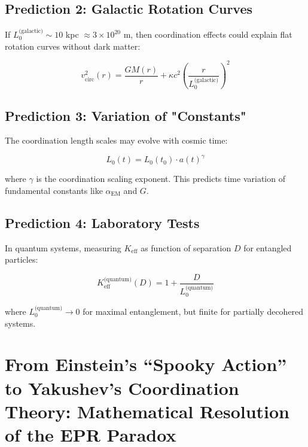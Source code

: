 \documentclass[11pt,a4paper]{article}
\begin{document}
	\subsection{Prediction 2: Galactic Rotation Curves}
	
	If $L_0^{\text{(galactic)}} \sim 10$ kpc $\approx 3\times10^{20}$ m, then 
	coordination effects could explain flat rotation curves without dark matter:
	
	\begin{equation}
		v_{\text{circ}}^2(r) = \frac{GM(r)}{r} + \kappa c^2 \left(\frac{r}{L_0^{\text{(galactic)}}}\right)^2
	\end{equation}
	
	\subsection{Prediction 3: Variation of "Constants"}
	
	The coordination length scales may evolve with cosmic time:
	
	\begin{equation}
		L_0(t) = L_0(t_0) \cdot a(t)^\gamma
	\end{equation}
	
	where $\gamma$ is the coordination scaling exponent. This predicts 
	time variation of fundamental constants like $\alpha_{\text{EM}}$ and $G$.
	
	\subsection{Prediction 4: Laboratory Tests}
	
	In quantum systems, measuring $K_{\mathrm{eff}}$ as function of 
	separation $D$ for entangled particles:
	
	\begin{equation}
		K_{\mathrm{eff}}^{\text{(quantum)}}(D) = 1 + \frac{D}{L_0^{\text{(quantum)}}}
	\end{equation}
	
	where $L_0^{\text{(quantum)}} \to 0$ for maximal entanglement, but 
	finite for partially decohered systems.
	
	\section{From Einstein's ``Spooky Action'' to Yakushev's Coordination Theory: Mathematical Resolution of the EPR Paradox}
	\label{sec:einstein-paradox}
	
	\begin{center}
		
	\end{center}
	
\end{document}
